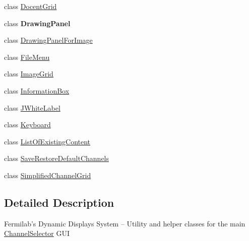 \begin{DoxyCompactItemize}
\item 
class \hyperlink{classgov_1_1fnal_1_1ppd_1_1dd_1_1changer_1_1DocentGrid}{Docent\-Grid}
\item 
class {\bfseries Drawing\-Panel}
\item 
class \hyperlink{classgov_1_1fnal_1_1ppd_1_1dd_1_1changer_1_1DrawingPanelForImage}{Drawing\-Panel\-For\-Image}
\item 
class \hyperlink{classgov_1_1fnal_1_1ppd_1_1dd_1_1changer_1_1FileMenu}{File\-Menu}
\item 
class \hyperlink{classgov_1_1fnal_1_1ppd_1_1dd_1_1changer_1_1ImageGrid}{Image\-Grid}
\item 
class \hyperlink{classgov_1_1fnal_1_1ppd_1_1dd_1_1changer_1_1InformationBox}{Information\-Box}
\item 
class \hyperlink{classgov_1_1fnal_1_1ppd_1_1dd_1_1changer_1_1JWhiteLabel}{J\-White\-Label}
\item 
class \hyperlink{classgov_1_1fnal_1_1ppd_1_1dd_1_1changer_1_1Keyboard}{Keyboard}
\item 
class \hyperlink{classgov_1_1fnal_1_1ppd_1_1dd_1_1changer_1_1ListOfExistingContent}{List\-Of\-Existing\-Content}
\item 
class \hyperlink{classgov_1_1fnal_1_1ppd_1_1dd_1_1changer_1_1SaveRestoreDefaultChannels}{Save\-Restore\-Default\-Channels}
\item 
class \hyperlink{classgov_1_1fnal_1_1ppd_1_1dd_1_1changer_1_1SimplifiedChannelGrid}{Simplified\-Channel\-Grid}
\end{DoxyCompactItemize}


\subsection{Detailed Description}
Fermilab's Dynamic Displays System -- Utility and helper classes for the main \hyperlink{classgov_1_1fnal_1_1ppd_1_1dd_1_1ChannelSelector}{Channel\-Selector} G\-U\-I
